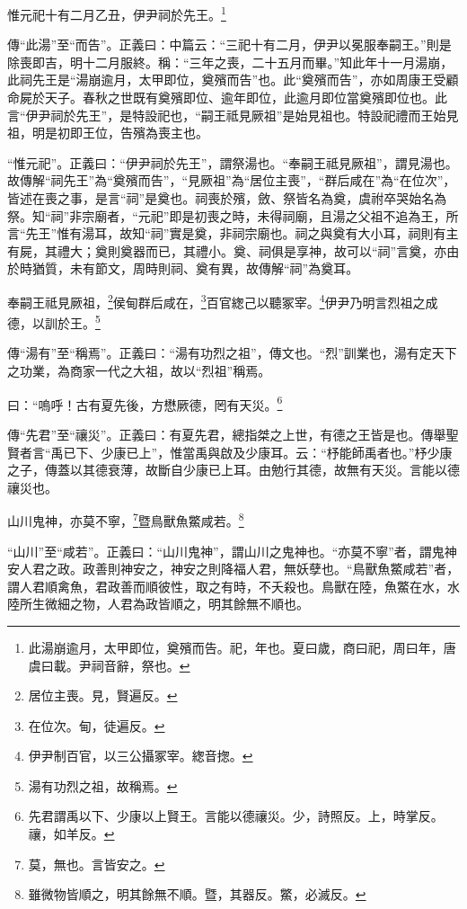 惟元祀十有二月乙丑，伊尹祠於先王。\footnote{此湯崩逾月，太甲即位，奠殯而告。祀，年也。夏曰歲，商曰祀，周曰年，唐虞曰載。尹祠音辭，祭也。}


{\noindent\zhuan{}\fzbyks 傳“此湯”至“而告”。正義曰：中篇云：“三祀十有二月，伊尹以冕服奉嗣王。”則是除喪即吉，明十二月服終。稱：“三年之喪，二十五月而畢。”知此年十一月湯崩，此祠先王是“湯崩逾月，太甲即位，奠殯而告”也。此“奠殯而告”，亦如周康王受顧命屍於天子。春秋之世既有奠殯即位、逾年即位，此逾月即位當奠殯即位也。此言“伊尹祠於先王”，是特設祀也，“嗣王祗見厥祖”是始見祖也。特設祀禮而王始見祖，明是初即王位，告殯為喪主也。 \par}

{\noindent\shu{}\fzkt “惟元祀”。正義曰：“伊尹祠於先王”，謂祭湯也。“奉嗣王祗見厥祖”，謂見湯也。故傳解“祠先王”為“奠殯而告”，“見厥祖”為“居位主喪”，“群后咸在”為“在位次”，皆述在喪之事，是言“祠”是奠也。祠喪於殯，斂、祭皆名為奠，虞祔卒哭始名為祭。知“祠”非宗廟者，“元祀”即是初喪之時，未得祠廟，且湯之父祖不追為王，所言“先王”惟有湯耳，故知“祠”實是奠，非祠宗廟也。祠之與奠有大小耳，祠則有主有屍，其禮大；奠則奠器而已，其禮小。奠、祠俱是享神，故可以“祠”言奠，亦由於時猶質，未有節文，周時則祠、奠有異，故傳解“祠”為奠耳。 \par}

奉嗣王祗見厥祖，\footnote{居位主喪。見，賢遍反。}侯甸群后咸在，\footnote{在位次。甸，徒遍反。}百官緫己以聽冢宰。\footnote{伊尹制百官，以三公攝冢宰。緫音揔。}伊尹乃明言烈祖之成德，以訓於王。\footnote{湯有功烈之祖，故稱焉。}

{\noindent\zhuan{}\fzbyks 傳“湯有”至“稱焉”。正義曰：“湯有功烈之祖”，傳文也。“烈”訓業也，湯有定天下之功業，為商家一代之大祖，故以“烈祖”稱焉。 \par}

曰：“嗚呼！古有夏先後，方懋厥德，罔有天災。\footnote{先君謂禹以下、少康以上賢王。言能以德禳災。少，詩照反。上，時掌反。禳，如羊反。}

{\noindent\zhuan{}\fzbyks 傳“先君”至“禳災”。正義曰：有夏先君，總指桀之上世，有德之王皆是也。傳舉聖賢者言“禹已下、少康已上”，惟當禹與啟及少康耳。云：“杼能師禹者也。”杼少康之子，傳蓋以其德衰薄，故斷自少康已上耳。由勉行其德，故無有天災。言能以德禳災也。 \par}

山川鬼神，亦莫不寧，\footnote{莫，無也。言皆安之。}暨鳥獸魚鱉咸若。\footnote{雖微物皆順之，明其餘無不順。暨，其器反。鱉，必滅反。}

{\noindent\shu{}\fzkt “山川”至“咸若”。正義曰：“山川鬼神”，謂山川之鬼神也。“亦莫不寧”者，謂鬼神安人君之政。政善則神安之，神安之則降福人君，無妖孽也。“鳥獸魚鱉咸若”者，謂人君順禽魚，君政善而順彼性，取之有時，不夭殺也。鳥獸在陸，魚鱉在水，水陸所生微細之物，人君為政皆順之，明其餘無不順也。 \par}

